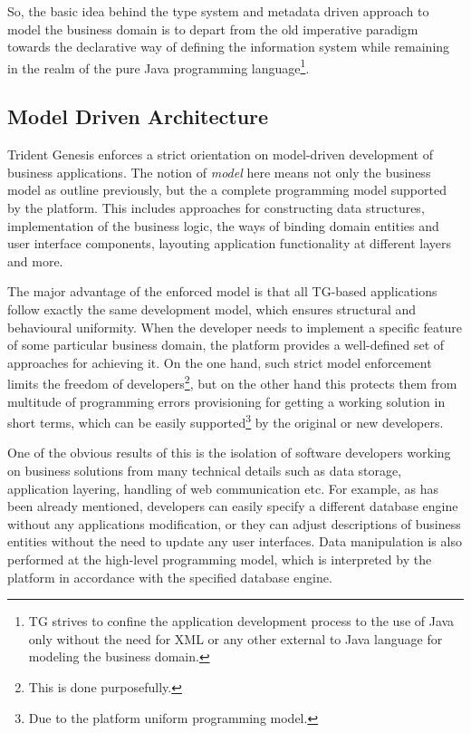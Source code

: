   So, the basic idea behind the type system and metadata driven approach to model the business domain is to depart from the old imperative paradigm towards the declarative way of defining the information system while remaining in the realm of the pure Java programming language\footnote{TG strives to confine the application development process to the use of Java only without the need for XML or any other external to Java language for modeling the business domain.}.
  
  \subsection{Model Driven Architecture}
  Trident Genesis enforces a strict orientation on model-driven development of business applications.
  The notion of \emph{model} here means not only the business model as outline previously, but the a complete programming model supported by the platform.
  This includes approaches for constructing data structures, implementation of the business logic, the ways of binding domain entities and user interface components, layouting application functionality at different layers and more.

  The major advantage of the enforced model is that all TG-based applications follow exactly the same development model, which ensures structural and behavioural uniformity.
  When the developer needs to implement a specific feature of some particular business domain, the platform provides a well-defined set of approaches for achieving it.
  On the one hand, such strict model enforcement limits the freedom of developers\footnote{This is done purposefully.}, but on the other hand this protects them from multitude of programming errors provisioning for getting a working solution in short terms, which can be easily supported\footnote{Due to the platform uniform programming model.} by the original or new developers.

  One of the obvious results of this is the isolation of software developers working on business solutions from many technical details such as data storage, application layering, handling of web communication etc.
  For example, as has been already mentioned, developers can easily specify a different database engine without any applications modification, or they can adjust descriptions of business entities without the need to update any user interfaces.
  Data manipulation is also performed at the high-level programming model, which is interpreted by the platform in accordance with the specified database engine.
  
